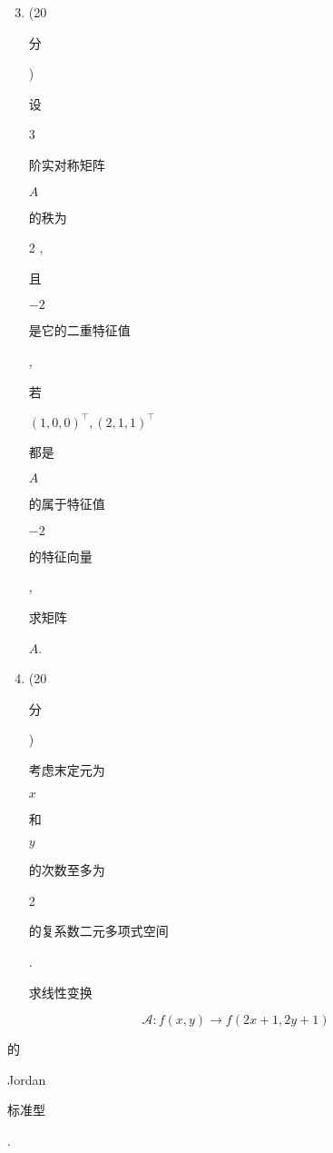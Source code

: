 \documentclass[10pt]{article}
\begin{document}
\begin{enumerate}
  \setcounter{enumi}{2}
  \item (20 \begin{CJK}{UTF8}{mj}分\end{CJK}) \begin{CJK}{UTF8}{mj}设\end{CJK} 3 \begin{CJK}{UTF8}{mj}阶实对称矩阵\end{CJK} $A$ \begin{CJK}{UTF8}{mj}的秩为\end{CJK} 2 , \begin{CJK}{UTF8}{mj}且\end{CJK} $-2$ \begin{CJK}{UTF8}{mj}是它的二重特征值\end{CJK}, \begin{CJK}{UTF8}{mj}若\end{CJK} $(1,0,0)^{\top},(2,1,1)^{\top}$ \begin{CJK}{UTF8}{mj}都是\end{CJK} $A$ \begin{CJK}{UTF8}{mj}的属于特征值\end{CJK} $-2$ \begin{CJK}{UTF8}{mj}的特征向量\end{CJK}, \begin{CJK}{UTF8}{mj}求矩阵\end{CJK} $A$.

  \item (20 \begin{CJK}{UTF8}{mj}分\end{CJK}) \begin{CJK}{UTF8}{mj}考虑末定元为\end{CJK} $x$ \begin{CJK}{UTF8}{mj}和\end{CJK} $y$ \begin{CJK}{UTF8}{mj}的次数至多为\end{CJK} 2 \begin{CJK}{UTF8}{mj}的复系数二元多项式空间\end{CJK}. \begin{CJK}{UTF8}{mj}求线性变换\end{CJK}

\end{enumerate}
$$
\mathscr{A}: f(x, y) \rightarrow f(2 x+1,2 y+1)
$$
\begin{CJK}{UTF8}{mj}的\end{CJK} Jordan \begin{CJK}{UTF8}{mj}标准型\end{CJK}.
\end{document}
